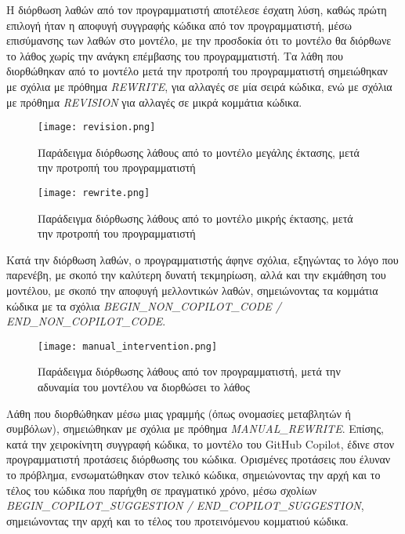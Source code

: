 Η διόρθωση λαθών από τον προγραμματιστή αποτέλεσε έσχατη λύση, καθώς
πρώτη επιλογή ήταν η αποφυγή συγγραφής κώδικα από τον προγραμματιστή,
μέσω επισύμανσης των λαθών στο μοντέλο, με την προσδοκία ότι το μοντέλο
θα διόρθωνε το λάθος χωρίς την ανάγκη επέμβασης του προγραμματιστή. Τα
λάθη που διορθώθηκαν από το μοντέλο μετά την προτροπή του προγραμματιστή
σημειώθηκαν με σχόλια με πρόθημα \textlatin{\textit{REWRITE}}, για
αλλαγές σε μία σειρά κώδικα, ενώ με σχόλια με πρόθημα
\textlatin{\textit{REVISION}} για αλλαγές σε μικρά κομμάτια κώδικα.

\begin{figure}[H]
  \begin{center}
    \texttt{[image: revision.png]}
    \caption{Παράδειγμα διόρθωσης λάθους από το μοντέλο μεγάλης έκτασης,
      μετά την προτροπή του προγραμματιστή}
  \end{center}
  \label{fig:revision}
\end{figure}

\begin{figure}[H]
  \begin{center}
    \texttt{[image: rewrite.png]}
    \caption{Παράδειγμα διόρθωσης λάθους από το μοντέλο μικρής έκτασης,
      μετά την προτροπή του προγραμματιστή}
  \end{center}
  \label{fig:rewrite}
\end{figure}

Κατά την διόρθωση λαθών, ο προγραμματιστής άφηνε σχόλια, εξηγώντας το
λόγο που παρενέβη, με σκοπό την καλύτερη δυνατή τεκμηρίωση, αλλά και την
εκμάθηση του μοντέλου, με σκοπό την αποφυγή μελλοντικών λαθών,
σημειώνοντας τα κομμάτια κώδικα με τα σχόλια
\textlatin{\textit{BEGIN\_NON\_COPILOT\_CODE /
    END\_NON\_COPILOT\_CODE}}.

\begin{figure}[H]
  \begin{center}
    \texttt{[image: manual\_intervention.png]}
    \caption{Παράδειγμα διόρθωσης λάθους από τον προγραμματιστή, μετά
      την αδυναμία του μοντέλου να διορθώσει το λάθος}
  \end{center}
  \label{fig:nonCopilotCode}
\end{figure}

Λάθη που διορθώθηκαν μέσω μιας γραμμής (όπως ονομασίες μεταβλητών ή
συμβόλων), σημειώθηκαν με σχόλια με πρόθημα
\textlatin{\textit{MANUAL\_REWRITE}}. Επίσης, κατά την χειροκίνητη
συγγραφή κώδικα, το μοντέλο του \textlatin{GitHub Copilot}, έδινε στον
προγραμματιστή προτάσεις διόρθωσης του κώδικα. Ορισμένες προτάσεις που
έλυναν το πρόβλημα, ενσωματώθηκαν στον τελικό κώδικα, σημειώνοντας την
αρχή και το τέλος του κώδικα που παρήχθη σε πραγματικό χρόνο, μέσω
σχολίων \textlatin{\textit{BEGIN\_COPILOT\_SUGGESTION /
    END\_COPILOT\_SUGGESTION}}, σημειώνοντας την αρχή και το τέλος του
προτεινόμενου κομματιού κώδικα.

